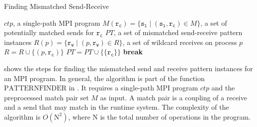 \begin{algorithm}
\caption{Finding Mismatched Send-Receive}\label{algo:mismatch}
\begin{algorithmic}[1]
\Require $\mathit{ctp}$, a single-path MPI program
\Require $\mathit{M}(\mathtt{r_c}) = \{\mathtt{s_l}\mid(\mathtt{s_l},\mathtt{r_c})\in\mathit{M}\}$, a set of potentially matched sends for $\mathtt{r_c}$
\State $\mathit{PT}$, a set of mismatched send-receive pattern instances
\State $\mathit{R}(p) = \{\mathtt{r_w}\mid(p,\mathtt{r_w})\in\mathit{R}\}$, a set of wildcard receives on process $p$
\State $\mathit{R} = \mathit{R} \cup \{(p,\mathtt{r_c})\}$
\EndIf
{}
\State $\mathit{PT} = \mathit{PT} \cup \{\{\mathtt{r_c}\}\}$
\State \textbf{break}
\EndIf
\EndFor
\EndIf
\EndFor
\EndFor
\end{algorithmic}
\end{algorithm}

 shows the steps for finding the mismatched send and receive pattern instances for an MPI program. In general, the algorithm is part of the function $\mathrm{PATTERNFINDER}$ in . It requires a single-path MPI program $\mathit{ctp}$ and the preprocessed match pair set $\mathit{M}$ as input. A match pair is a coupling of a receive and a send that may match in the runtime system. The complexity of the algorithm is $O(\mathrm{N}^2)$, where $\mathrm{N}$ is the total number of operations in the program. 




